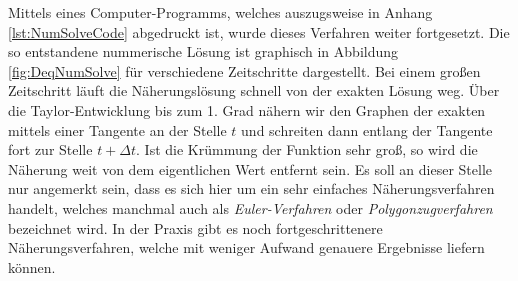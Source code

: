 Mittels eines Computer-Programms, welches auszugsweise in Anhang \ref{lst:NumSolveCode} abgedruckt ist, wurde dieses Verfahren weiter fortgesetzt. Die so entstandene nummerische Lösung ist graphisch in Abbildung \ref{fig:DeqNumSolve} für verschiedene Zeitschritte dargestellt. Bei einem großen Zeitschritt läuft die Näherungslösung schnell von der exakten Lösung weg. Über die Taylor-Entwicklung bis zum 1. Grad nähern wir den Graphen der exakten mittels einer Tangente an der Stelle $t$ und schreiten dann entlang der Tangente fort zur Stelle $t+\Delta t$. Ist die Krümmung der Funktion sehr groß, so wird die Näherung weit von dem eigentlichen Wert entfernt sein. Es soll an dieser Stelle nur angemerkt sein, dass es sich hier um ein sehr einfaches Näherungsverfahren handelt, welches manchmal auch als \emph{Euler-Verfahren} oder \emph{Polygonzugverfahren} bezeichnet wird. In der Praxis gibt es noch fortgeschrittenere Näherungsverfahren, welche mit weniger Aufwand genauere Ergebnisse liefern können.


